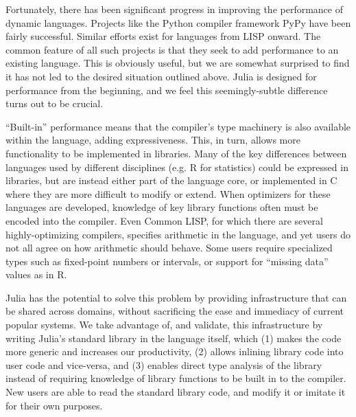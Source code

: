 \documentclass[11pt]{sigplanconf}
\begin{document}
Fortunately, there has been significant progress in improving the
performance of dynamic languages. Projects like the Python compiler
framework PyPy \cite{pypyjit} have been fairly successful. Similar efforts
exist for languages from LISP onward. The common feature of all
such projects is that they seek to add performance to an existing
language. This is obviously useful, but we are somewhat surprised to find
it has not led to the desired situation outlined above. Julia is designed
for performance from the beginning, and we feel this
seemingly-subtle difference turns out to be crucial.


``Built-in'' performance means that the compiler's type machinery is also
available within the language, adding expressiveness. This, in turn,
allows more functionality to be implemented in
libraries. Many of the key differences between languages used by different
disciplines (e.g. R for statistics) could be expressed in libraries, but
are instead either part of the language core, or implemented in C where
they are more difficult to modify or extend. When optimizers for these
languages are developed, knowledge of key library functions often must be
encoded into the compiler. Even Common LISP, for which there are several
highly-optimizing compilers, specifies arithmetic in the language, and
yet users do not all agree on how arithmetic should behave. Some
users require specialized types such as fixed-point numbers or intervals,
or support for ``missing data'' values as in R.

Julia has the potential to solve this problem by providing infrastructure
that can be shared across domains, without sacrificing the ease and
immediacy of current popular systems.
We take advantage of, and validate, this infrastructure by writing Julia's
standard library in the language itself, which (1) makes the code more
generic and increases our productivity, (2) allows inlining library
code into user code and vice-versa, and (3) enables direct type analysis
of the library instead of requiring knowledge of library functions to
be built in to the compiler. New users are able to read the standard
library code, and modify it or imitate it for their own purposes.

\end{document}
